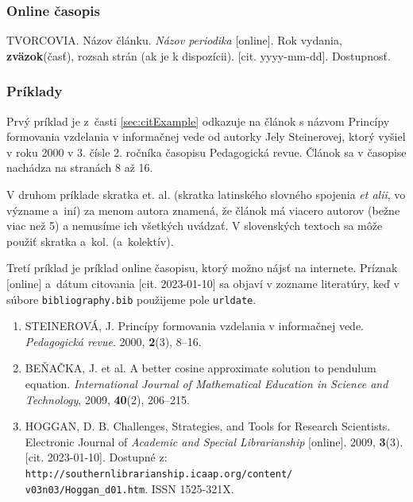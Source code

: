 \subsubsection*{\normalsize Online časopis}
\begin{trivlist}
\item TVORCOVIA. Názov článku. \textit{Názov periodika} [online]. Rok vydania, \textbf{zväzok}(časť), rozsah strán (ak je k dispozícii). [cit. yyyy-mm-dd]. Dostupnosť.
\end{trivlist}

\subsubsection*{\normalsize Príklady}
Prvý príklad je z~časti
\ref{sec:citExample} odkazuje na článok s názvom Princípy formovania vzdelania v informačnej vede od autorky Jely Steinerovej, ktorý vyšiel v roku 2000 v 3. čísle 2. ročníka časopisu Pedagogická revue. Článok sa v časopise nachádza na stranách 8 až 16.

V druhom príklade skratka et. al. (skratka latinského slovného spojenia \textit{et alii}, vo význame a~iní) za menom autora znamená, že článok má viacero autorov (bežne viac než 5) a nemusíme ich všetkých uvádzať.
V slovenských textoch sa môže použiť skratka a~kol. (a~kolektív).

Tretí príklad je príklad online časopisu, ktorý možno nájsť na internete. Príznak [online] a~dátum citovania [cit. 2023-01-10] sa objaví v zozname literatúry, keď v súbore \verb|bibliography.bib| použijeme pole \verb|urldate|.

\begin{enumerate}
\item STEINEROVÁ, J. Princípy formovania vzdelania v informačnej vede. \textit{Pedagogická revue}. 2000, \textbf{2}(3), 8–16.
\item BEŇAČKA, J. et al. A better cosine approximate solution to pendulum equation. \textit{International Journal of Mathematical Education in Science and Technology}, 2009, \textbf{40}(2), 206–215.
\item HOGGAN, D. B. Challenges, Strategies, and Tools for Research Scientists. Electronic Journal of \textit{Academic and Special Librarianship} [online]. 2009, \textbf{3}(3). [cit. 2023-01-10]. Dostupné z: \texttt{http://southernlibrarianship.icaap.org/content/ v03n03/Hoggan\_d01.htm}. ISSN 1525-321X.
\end{enumerate}

